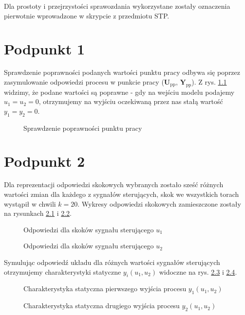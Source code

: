 Dla prostoty i przejrzystości sprawozdania wykorzystane zostały oznaczenia pierwotnie wprowadzone w skrypcie z przedmiotu STP.

\chapter{Podpunkt 1}
Sprawdzenie poprawności podanych wartości punktu pracy odbywa się poprzez zasymulowanie odpowiedzi procesu w punkcie pracy ($\boldsymbol{U}_{\mathrm{pp}}$, $\boldsymbol{Y}_{\mathrm{pp}}$). Z rys. \ref{Z1} widzimy, że podane wartości są poprawne - gdy na wejściu modelu podajemy $u_1=u_2=0$, otrzymujemy na wyjściu oczekiwaną przez nas stałą wartość $y_1=y_2=\num{0}$.

\begin{figure}[ht]
\centering

\caption{Sprawdzenie poprawności punktu pracy}
\label{Z1}
\end{figure}


\chapter{Podpunkt 2}
Dla reprezentacji odpowiedzi skokowych wybranych zostało sześć różnych wartości zmian dla każdego z sygnałów sterujących, skok we wszystkich torach wystąpił w chwili $k=20$. Wykresy odpowiedzi skokowych zamieszczone zostały na rysunkach \ref{Z2U1} i \ref{Z2U2}.

\begin{figure}[ht]
\centering

\caption{Odpowiedzi dla skoków sygnału sterującego $u_1$} 
\label{Z2U1}
\end{figure}

\begin{figure}[ht]
\centering

\caption{Odpowiedzi dla skoków sygnału sterującego $u_2$}
\label{Z2U2}
\end{figure}

Symulując odpowiedź układu dla różnych wartości sygnałów sterujących otrzymujemy charakterystyki statyczne $y_{i}(u_1,u_2)$ widoczne na rys. \ref{Z2Y1stat} i \ref{Z2Y2stat}.

\begin{figure}[ht]
\centering

\caption{Charakterystyka statyczna pierwszego wyjścia procesu $y_1(u_1,u_2)$}
\label{Z2Y1stat}
\end{figure}

\begin{figure}[ht]
\centering

\caption{Charakterystyka statyczna drugiego wyjścia procesu $y_2(u_1,u_2)$}
\label{Z2Y2stat}
\end{figure}

